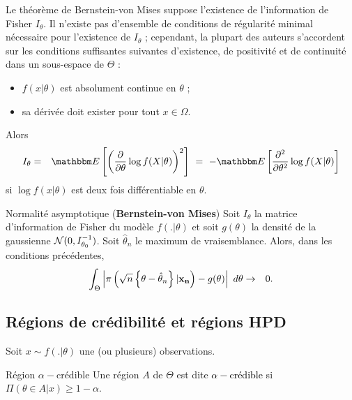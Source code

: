 

Le théorème de Bernstein-von Mises suppose l'existence de l'information de Fisher $I_{\theta}$. Il n'existe pas d'ensemble de conditions de régularité minimal nécessaire pour l'existence de $I_{\theta}$ ; cependant, la plupart des auteurs s'accordent sur les conditions suffisantes suivantes d'existence, de positivité et de continuité dans un sous-espace de $\Theta$ :
\begin{itemize}
    \item $f(x|\theta)$ est  absolument continue en $\theta$ ;
    \item sa dérivée doit exister pour tout $x\in\Omega$.
\end{itemize}
Alors
\begin{eqnarray*}
I_{\theta} & = & \E\left[\left(\frac{\partial }{\partial \theta} \log f(X|\theta)\right)^2\right] \ 
 = \ - \E\left[\frac{\partial^2 }{\partial \theta^2} \log f(X|\theta)\right]
\end{eqnarray*}
si $\log f(x|\theta)$ est deux fois différentiable en $\theta$. 


\begin{theorem}{Normalité asymptotique (\textbf{Bernstein-von Mises})}\label{von.mises}
Soit $I_{\theta}$ la matrice d'information de Fisher du modèle $f(.|\theta)$ et soit $g(\theta)$ la densité de la gaussienne ${\cal{N}}(0,I^{-1}_{\theta_0})$. Soit $\hat{\theta}_n$ le maximum de vraisemblance. Alors, dans les conditions précédentes,
\begin{eqnarray*}
\int_{\Theta}\left|\pi\left(\sqrt{n}\left\{\theta - \hat{\theta}_n\right\}|{\bf x_n}\right) - g(\theta)\right| \ d\theta & \rightarrow & 0.
\end{eqnarray*}
\end{theorem}

\if{} 
\fi
\vspace{1cm}

\subsection{Régions de crédibilité et régions HPD}\label{crédibilité}

Soit $x\sim f(.|\theta)$ une (ou plusieurs) observations. 

\begin{definition}{Région $\alpha-$crédible}
Une région $A$ de $\Theta$ est dite \textcolor{black}{$\alpha-$crédible} si $\Pi(\theta\in A|x)\geq 1-\alpha$.
\end{definition}

